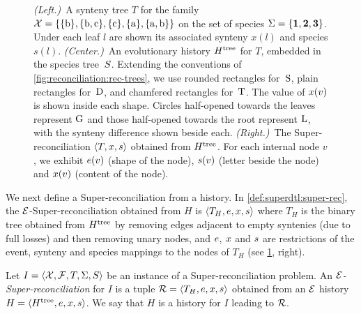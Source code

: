 \begin{figure}[htb]
    \capstart
    
    \caption[Input and possible evolutionary scenario for the SuperDTL model]{
        \emph{(Left.)}~A synteny tree \(T\) for the family \(\mathcal{X} = \{\mathrm{\{b\}}, \mathrm{\{b,c\}}, \mathrm{\{c\}}, \mathrm{\{a\}}, \mathrm{\{a,b\}}\}\) on the set of species \(\Sigma = \{\mathbf{1}, \mathbf{2}, \mathbf{3}\}\).
        Under each leaf \(l\) are shown its associated synteny \(x(l)\) and species \(s(l)\).
        \emph{(Center.)}~An evolutionary history \(H^\mathrm{tree}\) for \(T\), embedded in the species tree~\(S\).
        Extending the conventions of \cref{fig:reconciliation:rec-trees},
        we use rounded rectangles for~\(\mathrm{S}\),
        plain rectangles for~\(\mathrm{D}\),
        and chamfered rectangles for~\(\mathrm{T}\).
        The value of \(x(v)\) is shown inside each shape.
        Circles half-opened towards the leaves represent \(\mathrm{G}\)
        and those half-opened towards the root represent \(\mathrm{L}\),
        with the synteny difference shown beside each.
        \emph{(Right.)}~The Super-reconciliation \(\left\langle T, x, s\right\rangle\) obtained from \(H^\mathrm{tree}\).
        For each internal node \(v\), we exhibit \(e(v)\) (shape of the node), \(s(v)\) (letter beside the node) and \(x(v)\) (content of the node).
        \label{fig:evol-history-example}
    }
\end{figure}

We next define a Super-reconciliation from a history.
In \cref{def:superdtl:super-rec}, the \(\mathcal{E}\)-Super-reconciliation obtained from \(H\) is \(\left\langle T_{H}, e, x, s\right\rangle\)  where \(T_{H}\) is the binary tree obtained from \(H^\mathrm{tree}\) by removing edges adjacent to empty syntenies (due to full losses) and then removing unary nodes, and \(e\), \(x\) and \(s\) are restrictions of the event, synteny and species mappings to the nodes of \(T_{H}\) (see \cref{fig:evol-history-example}, right).

\begin{definition}\label{def:superdtl:super-rec}
    Let \(I = \left\langle\mathcal{X}, \mathcal{F}, T, \Sigma, S\right\rangle\) be an instance of a Super-reconciliation problem.
    An \emph{\(\mathcal{E}\)-Super-reconciliation} for \(I\) is a tuple \(\mathcal{R} = \left\langle T_H, e, x, s\right\rangle\) obtained from an \(\mathcal{E}\) history \(H = \left\langle H^\mathrm{tree}, e, x, s\right\rangle\).
    We say that \(H\) is a history for \(I\) leading to \(\mathcal{R}\).
\end{definition}

